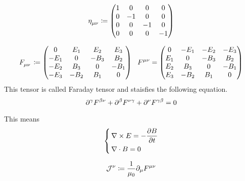 \documentclass[leqno]{ltjsarticle}
\begin{document}
	\begin{equation}
		\tensor{\eta}{_\mu_\nu} \coloneq
		\begin{pmatrix}
			1 & 0 & 0 & 0\\
			0 & -1 & 0 & 0\\
			0 & 0 & -1 & 0\\
			0 & 0 & 0 & -1
		\end{pmatrix}
	\end{equation}

\begin{equation}
\tensor{F}{_\mu_\nu}\coloneq
	\begin{pmatrix}
		0 & E_1 & E_2 & E_3\\
		-E_1 & 0 & -B_3 & B_2\\
		-E_2 & B_3 & 0 & -B_1\\
		-E_3 & -B_2 & B_1 & 0
	\end{pmatrix}\ \  
\tensor{F}{^\mu^\nu}=
	\begin{pmatrix}
		0 & -E_1 & -E_2 & -E_3\\
		E_1 & 0 & -B_3 & B_2\\
		E_2 & B_3 & 0 & -B_1\\
		E_3 & -B_2 & B_1 & 0
	\end{pmatrix}
\end{equation}
	This tensor is called Faraday tensor and staisfies the following equation.
	\begin{equation}
		\partial^\gamma\tensor{F}{^\beta^\nu} + \partial^\beta\tensor{F}{^\nu^\gamma} + \partial^\nu\tensor{F}{^\gamma^\beta} = 0 \label{maxwell}
	\end{equation}
	\begin{shadebox}
	This means 
	\begin{equation}
		\left\{\,
			\begin{aligned}
				&\nabla\times E= -\pdv{B}{t} \\
				&\nabla\cdot B = 0
			\end{aligned}
		\right.
	\end{equation}
\end{shadebox}
	
	\begin{equation}
		\mathcal{J}^{\nu} \coloneq \frac{1}{\mu_0}\partial_{\mu}\tensor{F}{^\mu^\nu}
	\end{equation}
\end{document}
